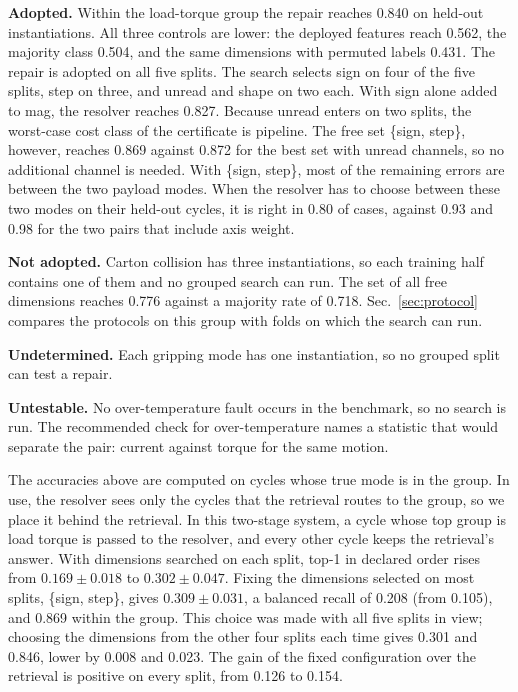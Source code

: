 \documentclass{ifacconf}
\begin{document}
\textbf{Adopted.} Within the load-torque group the repair reaches 0.840 on
held-out instantiations. All three controls are lower: the deployed features
reach 0.562, the majority class 0.504, and the same dimensions with permuted
labels 0.431. The repair is adopted on all five splits. The search selects sign
on four of the five splits, step on three, and unread and shape on two each.
With sign alone added to mag, the resolver reaches 0.827. Because unread enters
on two splits, the worst-case cost class of the certificate is pipeline. The
free set \{sign, step\}, however, reaches 0.869 against 0.872 for the best set
with unread channels, so no additional channel is needed. With \{sign, step\},
most of the remaining errors are between the two payload modes. When the
resolver has to choose between these two modes on their held-out cycles, it is
right in 0.80 of cases, against 0.93 and 0.98 for the two pairs that include
axis weight.

\textbf{Not adopted.} Carton collision has three instantiations, so each
training half contains one of them and no grouped search can run. The set of all
free dimensions reaches 0.776 against a majority rate of 0.718. 
Sec.~\ref{sec:protocol} compares the protocols on this group with folds on which
the search can run.

\textbf{Undetermined.} Each gripping mode has one instantiation, so no grouped
split can test a repair.

\textbf{Untestable.} No over-temperature fault occurs in the benchmark, so no
search is run. The recommended check for over-temperature names a statistic that
would separate the pair: current against torque for the same motion.

The accuracies above are computed on cycles whose true mode is in the group.
In use, the resolver sees only the cycles that the retrieval routes to the group,
so we place it behind the retrieval. In this two-stage system, a
cycle whose top group is load torque is passed to the resolver, and every other
cycle keeps the retrieval's answer. With dimensions searched on each split,
top-1 in declared order rises from $0.169 \pm 0.018$ to $0.302 \pm 0.047$.
Fixing the dimensions selected on most splits, \{sign, step\}, gives
$0.309 \pm 0.031$, a balanced recall of 0.208 (from 0.105), and 0.869 within the
group. This choice was made with all five splits in view; choosing the
dimensions from the other four splits each time gives 0.301 and 0.846, lower by
0.008 and 0.023. The gain of the fixed configuration over the retrieval is
positive on every split, from 0.126 to 0.154.
\end{document}
